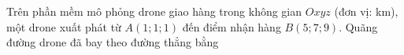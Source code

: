 \begin{ex}
Trên phần mềm mô phỏng drone giao hàng trong không gian $Oxyz$ (đơn vị: km), một drone xuất phát từ $A(1;1;1)$ đến điểm nhận hàng $B(5;7;9)$. Quãng đường drone đã bay theo đường thẳng bằng
\end{ex}
